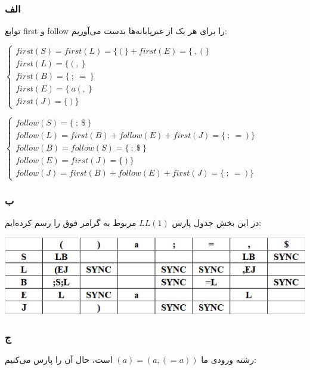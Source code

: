 \subsubsection*{الف}
توابع first و follow را برای هر یک از غیرپایانه‌ها بدست می‌آوریم:

\setLTR
$
\begin{cases}
	first(S)=first(L)=\{ \ ( \ \}+first(E) = \{ \ , \ ( \ \} \\
	first(L)= \{ \ ( \ , \ \} \\
	first(B)= \{ \ ; \ = \ \} \\
	first(E)= \{ \ a \ ( \ , \ \} \\
	first(J)= \{ \ ) \ \}
\end{cases}
	$

	$
\begin{cases}
	follow(S)=\{ \ ; \ \$ \ \} \\
	follow(L)=first(B)+follow(E)+first(J)= \{ \ ; \ = \ ) \ \} \\
	follow(B)=follow(S)=\{ \ ; \ \$ \ \} \\
	follow(E)=first(J)=\{ \ ) \ \} \\
	follow(J)=first(B)+follow(E)+first(J)= \{ \ ; \ = \ ) \ \}
\end{cases}
$
\setRTL

\subsubsection*{ب}
در این بخش جدول پارس $LL(1)$ مربوط به گرامر فوق را رسم کرده‌ایم:

\qquad\qquad\qquad\includegraphics[width=0.7\linewidth]{figs/1.png}

\pagebreak
\subsubsection*{ج}

رشته ورودی ما 
$(a)=(a,(=a))$
است، حال آن را پارس می‌کنیم:


